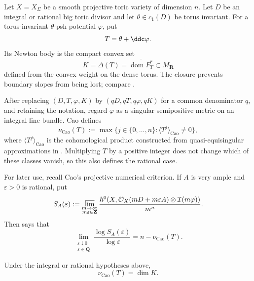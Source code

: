 Let \(X=X_\Sigma\) be a smooth projective toric variety of dimension
\(n\). Let \(D\) be an integral or rational big toric divisor and let
\(\theta\in c_1(D)\) be torus invariant. For a torus-invariant
\(\theta\)-psh potential \(\varphi\), put
\[
                         T=\theta+\ddc\varphi.
\]
Its Newton body is the compact convex set
\[
                         K=\Delta(T)
                          =\overline{\operatorname{dom}F_T^*}
                          \subset M_{\mathbf R}
\tag{69.25}\label{eq:verified-newton-body}
\]
defined from the convex weight on the dense torus.  The closure prevents
boundary slopes from being lost; compare
.

\begin{definition}
\label{def:verified-cao-dimension}
After replacing \((D,T,\varphi,K)\) by
\((qD,qT,q\varphi,qK)\) for a common denominator \(q\), and retaining
the notation, regard \(\varphi\) as a singular semipositive metric on
an integral line bundle. Cao defines
\[
 \nu_{\mathrm{Cao}}(T)
   :=\max\bigl\{j\in\{0,\ldots,n\}:
       \langle T^j\rangle_{\mathrm{Cao}}\ne0\bigr\},
\]
where \(\langle T^j\rangle_{\mathrm{Cao}}\) is the cohomological
product constructed from quasi-equisingular approximations in
\cite[Definitions~2--3]{Cao14}. Multiplying \(T\) by a positive
integer does not change which of these classes vanish, so this also
defines the rational case.
\end{definition}

For later use, recall Cao's projective numerical criterion. If \(A\)
is very ample and \(\varepsilon>0\) is rational, put
\[
 S_A(\varepsilon)
 :=\varlimsup_{\substack{m\to\infty\\m\varepsilon\in\mathbf Z}}
 \frac{h^0\!\left(X,
   \mathcal O_X(mD+m\varepsilon A)\otimes
   \mathcal I(m\varphi)\right)}{m^n}.
\]
Then \cite[Proposition~4.4]{Cao14} says that
\[
 \lim_{\substack{\varepsilon\downarrow0\\
                  \varepsilon\in\mathbf Q}}
       \frac{\log S_A(\varepsilon)}{\log\varepsilon}
       =n-\nu_{\mathrm{Cao}}(T).
\tag{69.26}\label{eq:verified-cao-characterization}
\]

\begin{theorem}\label{thm:verified-toric-dimension}
Under the integral or rational hypotheses above,
\[
                          \nu_{\mathrm{Cao}}(T)=\dim K.
\tag{69.27}\label{eq:verified-toric-dimension}
\]
\end{theorem}

